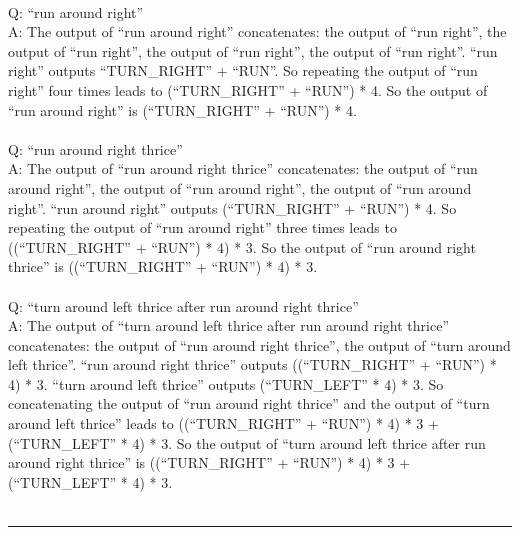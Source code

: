 {\\
Q: ``run around right'' \\
A: The output of ``run around right'' concatenates: the output of ``run right'', the output of ``run right'', the output of ``run right'', the output of ``run right''. ``run right'' outputs ``TURN\_RIGHT'' + ``RUN''. So repeating the output of ``run right'' four times leads to (``TURN\_RIGHT'' + ``RUN'') * 4. So the output of ``run around right'' is (``TURN\_RIGHT'' + ``RUN'') * 4. \\
\\
Q: ``run around right thrice'' \\
A: The output of ``run around right thrice'' concatenates: the output of ``run around right'', the output of ``run around right'', the output of ``run around right''. ``run around right'' outputs (``TURN\_RIGHT'' + ``RUN'') * 4. So repeating the output of ``run around right'' three times leads to ((``TURN\_RIGHT'' + ``RUN'') * 4) * 3. So the output of ``run around right thrice'' is ((``TURN\_RIGHT'' + ``RUN'') * 4) * 3. \\
\\
Q: ``turn around left thrice after run around right thrice'' \\
A: The output of ``turn around left thrice after run around right thrice'' concatenates: the output of ``run around right thrice'', the output of ``turn around left thrice''. ``run around right thrice'' outputs ((``TURN\_RIGHT'' + ``RUN'') * 4) * 3. ``turn around left thrice'' outputs (``TURN\_LEFT'' * 4) * 3. So concatenating the output of ``run around right thrice'' and the output of ``turn around left thrice'' leads to ((``TURN\_RIGHT'' + ``RUN'') * 4) * 3 + (``TURN\_LEFT'' * 4) * 3. So the output of ``turn around left thrice after run around right thrice'' is ((``TURN\_RIGHT'' + ``RUN'') * 4) * 3 + (``TURN\_LEFT'' * 4) * 3. \\
\\
\hrule \bigskip
}

